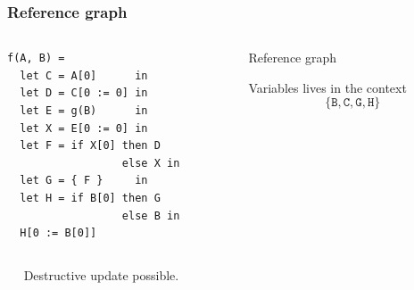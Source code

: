 \documentclass{beamer}
\newcommand{\cl}[1]{\texttt{#1}}
\begin{document}
\begin{frame}[fragile]
\frametitle{Reference graph}
\begin{columns}
\begin{column}{0.5\textwidth}
\begin{lstlisting}
f(A, B) =
  let C = A[0]      in
  let D = C[0 := 0] in
  let E = g(B)      in
  let X = E[0 := 0] in
  let F = if X[0] then D
                  else X in
  let G = { F }     in
  let H = if B[0] then G
                  else B in
  H[0 := B[0]]
\end{lstlisting}
\end{column}
\begin{column}{0.5\textwidth}
Reference graph
\begin{center}
\end{center}
Variables lives in the context
$$\{ \cl{B}, \cl{C}, \cl{G}, \cl{H} \}$$
\end{column}
\end{columns}
\ \newline \ \newline
Destructive update possible.
\end{frame}
\end{document}
